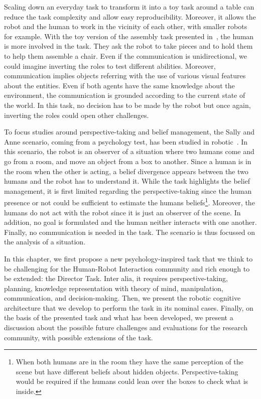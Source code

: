 \documentclass[a4paper,11pt,twoside]{StyleThese}
\begin{document}
Scaling down an everyday task to transform it into a toy task around a table can reduce the task complexity and allow easy reproducibility. Moreover, it allows the robot and the human to work in the vicinity of each other, with smaller robots for example. With the toy version of the assembly task presented in~\cite{brawer_2018_situated}, the human is more involved in the task. They ask the robot to take pieces and to hold them to help them assemble a chair. Even if the communication is unidirectional, we could imagine inverting the roles to test different abilities. Moreover, communication implies objects referring with the use of various visual features about the entities. Even if both agents have the same knowledge about the environment, the communication is grounded according to the current state of the world. In this task, no decision has to be made by the robot but once again, inverting the roles could open other challenges.

To focus studies around perspective-taking and belief management, the Sally and Anne scenario, coming from a psychology test, has been studied in robotic~\cite{milliez_2014_framework}. In this scenario, the robot is an observer of a situation where two humans come and go from a room, and move an object from a box to another. Since a human is in the room when the other is acting, a belief divergence appears between the two humans and the robot has to understand it. While the task highlights the belief management, it is first limited regarding the perspective-taking since the human presence or not could be sufficient to estimate the humans beliefs\footnote{When both humans are in the room they have the same perception of the scene but have different beliefs about hidden objects. Perspective-taking would be required if the humans could lean over the boxes to check what is inside.}. Moreover, the humans do not act with the robot since it is just an observer of the scene. In addition, no goal is formulated and the human neither interacts with one another. Finally, no communication is needed in the task. The scenario is thus focussed on the analysis of a situation.

In this chapter, we first propose a new psychology-inspired task that we think to be challenging for the Human-Robot Interaction community and rich enough to be extended: the Director Task. Inter alia, it requires perspective-taking, planning, knowledge representation with theory of mind, manipulation, communication, and decision-making. Then, we present the robotic cognitive architecture that we develop to perform the task in its nominal cases. Finally, on the basis of the presented task and what has been developed, we present a discussion about the possible future challenges and evaluations for the research community, with possible extensions of the task.
\end{document}
